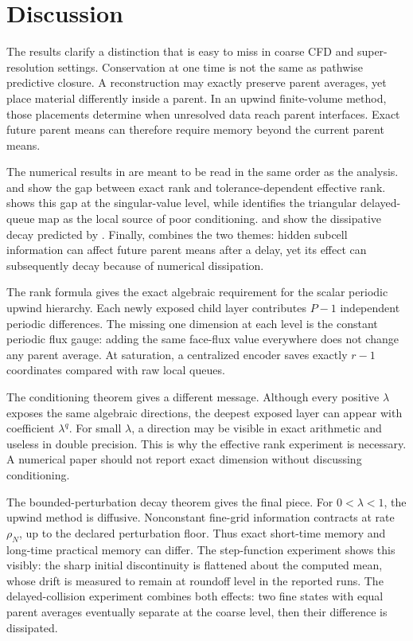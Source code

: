 \documentclass[preprint,12pt]{elsarticle}
\theoremstyle{plain}
\theoremstyle{remark}
\theoremstyle{definition}
\begin{document}
\section{Discussion} \label{sec:discussion}

The results clarify a distinction that is easy to miss in coarse CFD and
super-resolution settings.  Conservation at one time is not the same as
pathwise predictive closure.  A reconstruction may exactly preserve parent
averages, yet place material differently inside a parent.  In an upwind
finite-volume method, those placements determine when unresolved data reach
parent interfaces.  Exact future parent means can therefore require memory
beyond the current parent means.

The numerical results in  are meant to be read in the same order as
the analysis.   and  show the gap between exact rank and tolerance-dependent effective rank.  
shows this gap at the singular-value level, while
 identifies the triangular delayed-queue
map as the local source of poor conditioning.  
and  show the dissipative decay predicted by .  Finally,  combines the two themes: hidden subcell information can affect future parent means after a delay, yet its effect can subsequently decay because of numerical dissipation.

The rank formula gives the exact algebraic requirement for the scalar
periodic upwind hierarchy.  Each newly exposed child layer contributes
\(P-1\) independent periodic differences.  The missing one dimension at each level is the constant periodic flux gauge: adding the same face-flux value everywhere does not change any parent average.  At saturation, a centralized encoder saves exactly \(r-1\) coordinates compared with raw local queues.

The conditioning theorem gives a different message.  Although every positive \(\lambda\) exposes the same algebraic directions, the deepest exposed layer can appear with coefficient \(\lambda^q\).  For small \(\lambda\), a direction may be visible in exact arithmetic and useless in double precision.  This is why the effective rank experiment is necessary.  A numerical paper should not report exact dimension without discussing conditioning.

The bounded-perturbation decay theorem gives the final piece.  For
\(0<\lambda<1\), the upwind method is diffusive.  Nonconstant fine-grid
information contracts at rate \(\rho_N\), up to the declared perturbation floor.  Thus exact short-time memory and long-time practical memory can differ.  The step-function experiment shows this visibly: the sharp initial discontinuity is flattened about the computed mean, whose drift is measured to remain at roundoff level in the reported runs.  The delayed-collision experiment combines both effects: two fine states with equal parent averages eventually separate at the coarse level, then their difference is dissipated.
\end{document}

